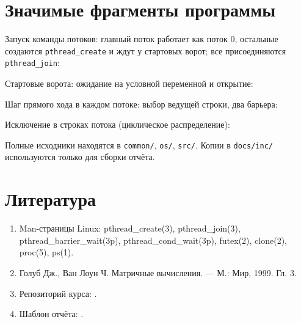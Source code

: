 \section{Значимые фрагменты программы}

Запуск команды потоков: главный поток работает как поток 0, остальные создаются
\texttt{pthread\_create} и ждут у стартовых ворот; все присоединяются \texttt{pthread\_join}:


Стартовые ворота: ожидание на условной переменной и открытие:


Шаг прямого хода в каждом потоке: выбор ведущей строки, два барьера:


Исключение в строках потока (циклическое распределение):


Полные исходники находятся в \texttt{common/}, \texttt{os/}, \texttt{src/}.
Копии в \texttt{docs/inc/} используются только для сборки отчёта.

\section{Литература}
\begin{enumerate}
\item Man-страницы Linux: pthread\_create(3), pthread\_join(3), pthread\_barrier\_wait(3p),
      pthread\_cond\_wait(3p), futex(2), clone(2), proc(5), ps(1).
\item Голуб Дж., Ван Лоун Ч. Матричные вычисления. --- М.: Мир, 1999. Гл. 3.
\item Репозиторий курса: .
\item Шаблон отчёта: .
\end{enumerate}
